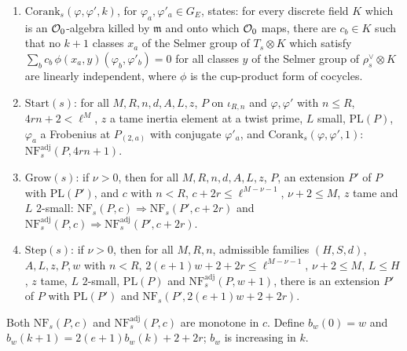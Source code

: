 \begin{definition}
\begin{enumerate}[label=(\alph*)]
\item $\mathrm{Corank}_s(\varphi,\varphi',k)$, for $\varphi_a,\varphi'_a\in G_E$, states: for every discrete field $K$ which is an
  $\mathcal O_0$-algebra killed by $\mathfrak m$ and onto which $\mathcal O_0$ maps, there are $c_b\in K$ such that no $k+1$
  classes $x_a$ of the Selmer group of $T_s\otimes K$ which satisfy $\sum_bc_b\,\phi(x_a,y)(\varphi_b,\varphi'_b)=0$ for all
  classes $y$ of the Selmer group of $\rho^\vee_s\otimes K$ are linearly independent, where $\phi$ is the cup-product form of
  cocycles.
\item $\mathrm{Start}(s)$: for all $M,R,n,d,A,L,z$, $P$ on $\iota_{R,n}$ and $\varphi,\varphi'$ with $n\le R$, $4rn+2<\ell^M$, $z$ a tame
  inertia element at a twist prime, $L$ small, $\mathrm{PL}(P)$, $\varphi_a$ a Frobenius at $P_{(2,a)}$ with conjugate
  $\varphi'_a$, and $\mathrm{Corank}_s(\varphi,\varphi',1)$: $\mathrm{NF}^{\mathrm{adj}}_s(P,4rn+1)$.
\item $\mathrm{Grow}(s)$: if $\nu>0$, then for all $M,R,n,d,A,L,z$, $P$, an extension $P'$ of $P$ with $\mathrm{PL}(P')$, and $c$
  with $n<R$, $c+2r\le\ell^{M-\nu-1}$, $\nu+2\le M$, $z$ tame and $L$ $2$-small: $\mathrm{NF}_s(P,c)\Rightarrow\mathrm{NF}_s(P',c+2r)$
  and $\mathrm{NF}^{\mathrm{adj}}_s(P,c)\Rightarrow\mathrm{NF}^{\mathrm{adj}}_s(P',c+2r)$.
\item $\mathrm{Step}(s)$: if $\nu>0$, then for all $M,R,n$, admissible families $(H,S,d)$, $A,L,z,P,w$ with $n<R$,
  $2(e+1)w+2+2r\le\ell^{M-\nu-1}$, $\nu+2\le M$, $L\le H$, $z$ tame, $L$ $2$-small, $\mathrm{PL}(P)$ and $\mathrm{NF}^{\mathrm{adj}}_s(P,w+1)$,
  there is an extension $P'$ of $P$ with $\mathrm{PL}(P')$ and $\mathrm{NF}_s(P',2(e+1)w+2+2r)$.
\end{enumerate}
%
%
%
\end{definition}

Both $\mathrm{NF}_s(P,c)$ and $\mathrm{NF}^{\mathrm{adj}}_s(P,c)$ are monotone in $c$. Define $b_w(0)=w$ and
$b_w(k+1)=2(e+1)b_w(k)+2+2r$; $b_w$ is increasing in $k$.

